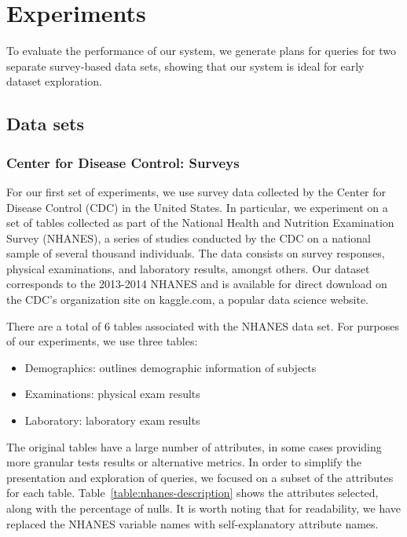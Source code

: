 \section{Experiments}
To evaluate the performance of our system, we generate plans for queries
for two separate survey-based data sets, showing that our system
is ideal for early dataset exploration.

\subsection{Data sets} \label{subsec:datasets}
\subsubsection{Center for Disease Control: Surveys}
For our first set of experiments, we use survey data collected by the 
Center for Disease Control (CDC) in the United States. In particular, we
experiment on a set of tables collected as part of the National
Health and Nutrition Examination Survey (NHANES), a series of studies
conducted by the CDC on a national sample of several thousand individuals\cite{cdc-data}.
The data consists on survey responses, physical examinations, and laboratory
results, amongst others. Our dataset corresponds to the 2013-2014 NHANES
and is available for direct download on the CDC's organization site on 
kaggle.com, a popular data science website.

There are a total of 6 tables associated with the NHANES data set. For purposes
of our experiments, we use three tables:

\begin{itemize}
	\item Demographics: outlines demographic information of subjects
	\item Examinations: physical exam results
	\item Laboratory: laboratory exam results
\end{itemize}

The original tables have a large number of attributes, in some cases providing more granular
tests results or alternative metrics. In order to simplify the presentation and
exploration of queries, we focused on a subset of the attributes for each table.
Table~\ref{table:nhanes-description} shows the attributes selected, along with the
percentage of nulls. It is worth noting that for readability, we have replaced the
NHANES variable names with self-explanatory attribute names.

